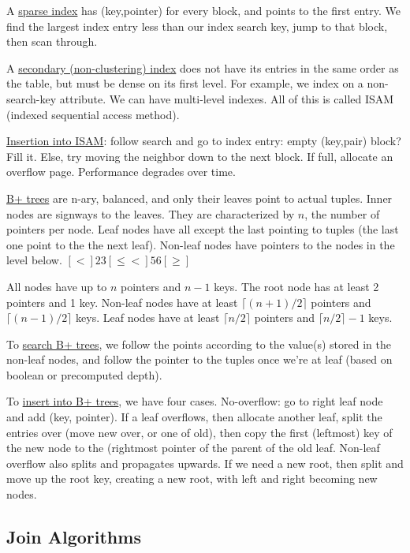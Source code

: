 \documentclass[10pt,letterpaper,twocolumn]{article}
\begin{document}
A \underline{sparse index} has (key,pointer) for 
every block, and points to the first entry. We
find the largest index entry less than our 
index search key, jump to that block, then scan through.

A \underline{secondary (non-clustering) index} does not have its
entries in the same order as the table, but must be 
dense on its first level. For example, we index
on a non-search-key attribute. We can have multi-level
indexes. All of this is called ISAM (indexed sequential access method).

\underline{Insertion into ISAM}: follow search and 
go to index entry: empty (key,pair) block? Fill it. 
Else, try moving the neighbor down to the next block.
If full, allocate an overflow page. Performance degrades over time. 

\underline{B+ trees} are n-ary, balanced, and only their leaves
point to actual tuples. Inner nodes are signways
to the leaves. They are characterized by $ n $, 
the number of pointers per node. Leaf nodes
have all except the last pointing to tuples (the
last one point to the the next leaf).  
Non-leaf nodes have pointers
to the nodes in the level below. $[<]23[\le <]56[\ge] $ 

All nodes have up to $ n $ pointers and $ n - 1 $ keys. 
The root node has at least 2 pointers and 1 key. 
Non-leaf nodes have at least $ \lceil (n+1)/2 \rceil $ 
pointers and $ \lceil (n-1)/2 \rceil $ keys.
Leaf nodes have at least $ \lceil n/2 \rceil $ pointers
and $ \lceil n/2 \rceil - 1 $ keys. 

To \underline{search B+ trees}, we follow the points
according to the value(s) stored in the non-leaf 
nodes, and follow the pointer to the tuples once
we're at leaf (based on boolean or precomputed depth).

To \underline{insert into B+ trees}, we have 
four cases. No-overflow: go to right leaf node
and add (key, pointer). If a leaf overflows, 
then allocate another leaf, split the entries over
(move new over, or one of old), then copy the 
first (leftmost) key of the new node to the (rightmost
pointer of the parent of the old leaf. Non-leaf
overflow also splits and propagates upwards.
If we need a new root, then split and move up the
root key, creating a new root, with left and right
becoming new nodes. 


\subsection{Join Algorithms}
\end{document}
